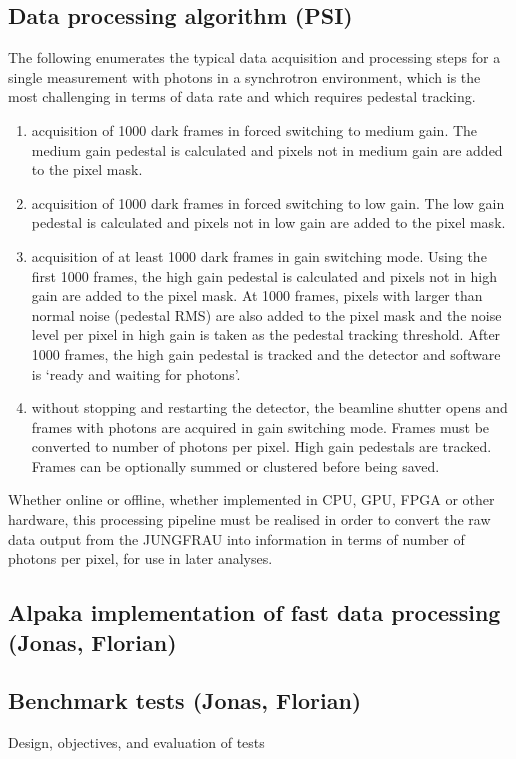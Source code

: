\documentclass[a4paper]{article}
\begin{document}
\subsection{Data processing algorithm (PSI)}
\label{subsec:alg}
The following enumerates the typical data acquisition and processing steps for a single measurement with photons in a synchrotron environment, which is the most challenging in terms of data rate and which requires pedestal tracking.
\begin{enumerate}
\item acquisition of 1000 dark frames in forced switching to medium gain. The medium gain pedestal is calculated and pixels not in medium gain are added to the pixel mask.
\item acquisition of 1000 dark frames in forced switching to low gain. The low gain pedestal is calculated and pixels not in low gain are added to the pixel mask.
\item acquisition of at least 1000 dark frames in gain switching mode. Using the first 1000 frames, the high gain pedestal is calculated and pixels not in high gain are added to the pixel mask. At 1000 frames, pixels with larger than normal noise (pedestal RMS) are also added to the pixel mask and the noise level per pixel in high gain is taken as the pedestal tracking threshold. After 1000 frames, the high gain pedestal is tracked and the detector and software is `ready and waiting for photons'.
\item without stopping and restarting the detector, the beamline shutter opens and frames with photons are acquired in gain switching mode. Frames must be converted to number of photons per pixel. High gain pedestals are tracked. Frames can be optionally summed or clustered before being saved.
\end{enumerate}
Whether online or offline, whether implemented in CPU, GPU, FPGA or other hardware, this processing pipeline must be realised in order to convert the raw data output from the JUNGFRAU into information in terms of number of photons per pixel, for use in later analyses.


\subsection{Alpaka implementation of fast data processing (Jonas, Florian)}
\label{subsec:alpaka}

\subsection{Benchmark tests (Jonas, Florian)}
\label{subsec:benchmark}
Design, objectives, and evaluation of tests
\end{document}
